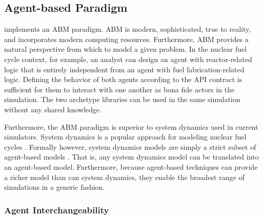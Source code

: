 \subsection{Agent-based Paradigm}

\Cyclus implements an \acrlong{ABM} paradigm.  \gls{ABM} is modern, sophisticated, 
true to reality, and incorporates modern computing resources.
Furthermore, \gls{ABM} provides a natural 
perspective from which to model a given problem. In the nuclear fuel cycle 
context, for example, an analyst can design an agent with reactor-related logic 
that is entirely independent from an agent with fuel fabrication-related 
logic. Defining the behavior of both agents according to the 
\gls{API} contract is sufficient for them to interact with one another as 
bona fide actors in the simulation.  The two archetype libraries can be used in the same
simulation without any shared knowledge.

Furthermore, the \gls{ABM} paradigm is superior to system dynamics used in 
current simulators.
System dynamics is a popular approach for modeling nuclear fuel cycles 
\cite{jacobson_vision_2009,van_den_durpel_daness_2009,guerin_impact_2009,guerin_benchmark_2009}. 
Formally however, system dynamics models are simply a strict subset of agent-based models
\cite{macal_agent-based_2010}.
That is, any system dynamics model can be translated
into an agent-based model. Furthermore, because agent-based
techniques can provide a richer model than can system dynamics, they enable the 
broadest range of simulations in a generic fashion.

\subsubsection{Agent Interchangeability}\label{sec:interchangeability}


